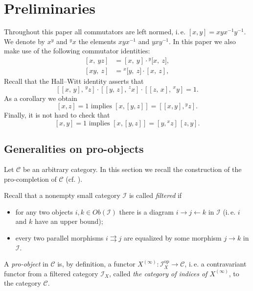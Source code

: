 \documentclass[oneside, 11pt]{amsart}
\numberwithin{equation}{section}
\theoremstyle{definition}
\theoremstyle{remark}
\newcommand{\op}{\mathrm{op}}
\newcommand{\up}[2]{{^{#1}\!{#2}}}
\begin{document}
\section{Preliminaries}
Throughout this paper all commutators are left normed, i.\,e. $[x, y] = xyx^{-1}y^{-1}$. We denote by $x^y$ and $\up{y}x$ the elements $xyx^{-1}$ and $yxy^{-1}$.
In this paper we also make use of the following commutator identities:
\begin{align}
\label{eq:comm-mult-rhs}[x,\ yz]& =   [x,\ y] \cdot \up{y}[x,\ z],
\\ \label{eq:comm-mult-lhs}[xy,\ z]& = \up{x}[y,\ z] \cdot [x,\ z],
\end{align}
Recall that the Hall--Witt identity asserts that
\begin{equation} \label{eq:HW} [[x,\,y],\,\up{y} z] \cdot [[y,\,z],\,\up{z} x] \cdot [[z,\,x],\,\up{x} y] = 1. \end{equation}
As a corollary we obtain
\begin{equation} \label{eq:HW-corr} [x,z] = 1 \text{ implies } [x, [y,z]] = [[x,y],\up{y}z].
\end{equation}
Finally, it is not hard to check that
\begin{equation} \label{eq:comm-new}
[x, y] = 1 \text{ implies } [x, [y, z]] = [y, \up xz]\, [z, y].
\end{equation}

\subsection{Generalities on pro-objects} \label{sec:pro-obj}
Let \(\mathcal C\) be an arbitrary category.
In this section we recall the construction of the pro-completion of \(\mathcal C\) (cf. \cite[Section~6.1]{SK06}).

Recall that a nonempty small category \(\mathcal I\) is called {\it filtered} if
\begin{itemize}
 \item for any two objects \(i, k \in Ob(\mathcal{I})\) there is a diagram \(i \to j \leftarrow k\) in \(\mathcal I\) (i.\,e. $i$ and $k$ have an upper bound);
 \item every two parallel morphisms \(i \rightrightarrows j\) are equalized by some morphism \(j \to k\) in \(\mathcal I\).
\end{itemize}
A {\it pro-object} in \(\mathcal C\) is, by definition, a functor $X^{(\infty)}\colon \mathcal{I}_X^{\op} \to \mathcal{C}$, i.\,e. a contravariant functor from a filtered category \(\mathcal I_X\), called {\it the category of indices of $X^{(\infty)}$}, to the category \(\mathcal C\). 
\end{document}

